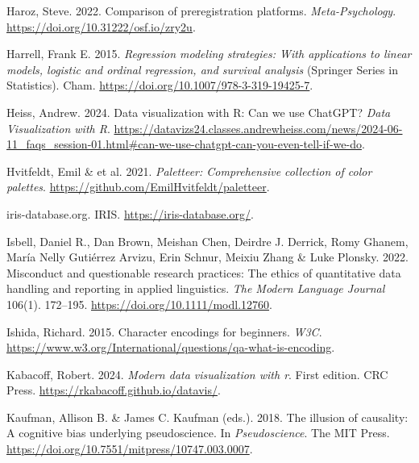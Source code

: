 \documentclass[
  letterpaper,
  DIV=11,
  numbers=noendperiod]{scrreprt}
\newlength{\cslhangindent}
\newenvironment{CSLReferences}[2] %
 {\begin{list}{}{%
  \setlength{\itemindent}{0pt}
  \setlength{\leftmargin}{0pt}
  \setlength{\parsep}{0pt}
  \ifodd #1
   \setlength{\leftmargin}{\cslhangindent}
   \setlength{\itemindent}{-1\cslhangindent}
  \fi
  \setlength{\itemsep}{#2\baselineskip}}}
 {\end{list}}
\begin{document}
\begin{CSLReferences}{1}{0}
Haroz, Steve. 2022. Comparison of preregistration platforms.
\emph{Meta-Psychology}. \url{https://doi.org/10.31222/osf.io/zry2u}.

Harrell, Frank E. 2015. \emph{Regression modeling strategies: With
applications to linear models, logistic and ordinal regression, and
survival analysis} (Springer Series in Statistics). Cham.
\url{https://doi.org/10.1007/978-3-319-19425-7}.

Heiss, Andrew. 2024. Data visualization with {R}: Can we use ChatGPT?
\emph{Data Visualization with R}.
\url{https://datavizs24.classes.andrewheiss.com/news/2024-06-11_faqs_session-01.html\#can-we-use-chatgpt-can-you-even-tell-if-we-do}.

{Hvitfeldt, Emil \& et al.} 2021. \emph{Paletteer: Comprehensive
collection of color palettes}.
\url{https://github.com/EmilHvitfeldt/paletteer}.

{iris-database.org}. IRIS. \url{https://iris-database.org/}.

Isbell, Daniel R., Dan Brown, Meishan Chen, Deirdre J. Derrick, Romy
Ghanem, María Nelly Gutiérrez Arvizu, Erin Schnur, Meixiu Zhang \& Luke
Plonsky. 2022. Misconduct and questionable research practices: The
ethics of quantitative data handling and reporting in applied
linguistics. \emph{The Modern Language Journal} 106(1). 172--195.
\url{https://doi.org/10.1111/modl.12760}.

Ishida, Richard. 2015. Character encodings for beginners. \emph{W3C}.
\url{https://www.w3.org/International/questions/qa-what-is-encoding}.

Kabacoff, Robert. 2024. \emph{Modern data visualization with r}. First
edition. CRC Press. \url{https://rkabacoff.github.io/datavis/}.

Kaufman, Allison B. \& James C. Kaufman (eds.). 2018. The illusion of
causality: A cognitive bias underlying pseudoscience. In
\emph{Pseudoscience}. The MIT Press.
\url{https://doi.org/10.7551/mitpress/10747.003.0007}.


\end{CSLReferences}
\end{document}
